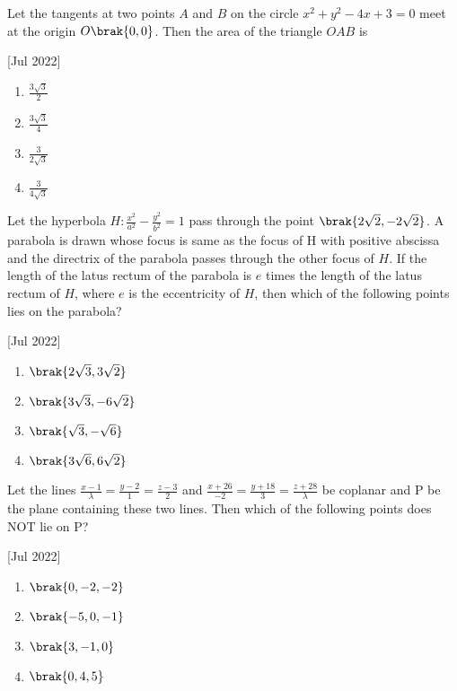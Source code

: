     \item Let the tangents at two points $A$ and $B$ on the circle $x^2+y^2-4x+3=0$ meet at the origin $O\brak{0,0}$. Then the area of the triangle $OAB$ is
    
    \hfill[Jul 2022]

        \begin{multicols}{4}
            \begin{enumerate}
                \item $\frac{3\sqrt{3}}{2}$
                \item $\frac{3\sqrt{3}}{4}$
                \item $\frac{3}{2\sqrt{3}}$
                \item $\frac{3}{4\sqrt{3}}$
            \end{enumerate}
        \end{multicols}

    \item Let the hyperbola $H:\frac{x^2}{a^2}-\frac{y^2}{b^2}=1$ pass through the point $\brak{2\sqrt{2},-2\sqrt{2}}$. A parabola is drawn whose focus is same as the focus of H with positive abscissa and the directrix of the parabola passes through the other focus of $H$. If the length of the latus rectum of the parabola is $e$ times the length of the latus rectum of $H$, where $e$ is the eccentricity of $H$, then which of the following points lies on the parabola?
    
    \hfill[Jul 2022]

        \begin{multicols}{4}
            \begin{enumerate}
                \item $\brak{2\sqrt{3},3\sqrt{2}}$
                \item $\brak{3\sqrt{3},-6\sqrt{2}}$
                \item $\brak{\sqrt{3},-\sqrt{6}}$
                \item $\brak{3\sqrt{6},6\sqrt{2}}$
            \end{enumerate}
        \end{multicols}

    \item Let the lines $\frac{x-1}{\lambda}=\frac{y-2}{1}=\frac{z-3}{2}$ and $\frac{x+26}{-2}=\frac{y+18}{3}=\frac{z+28}{\lambda}$ be coplanar and P be the plane containing these two lines. Then which of the following points does NOT lie on P?
    
    \hfill[Jul 2022]

        \begin{multicols}{4}
            \begin{enumerate}
                \item $\brak{0, -2, -2}$
                \item $\brak{-5, 0, -1}$
                \item $\brak{3, -1, 0}$
                \item $\brak{0, 4, 5}$
            \end{enumerate}
        \end{multicols}

